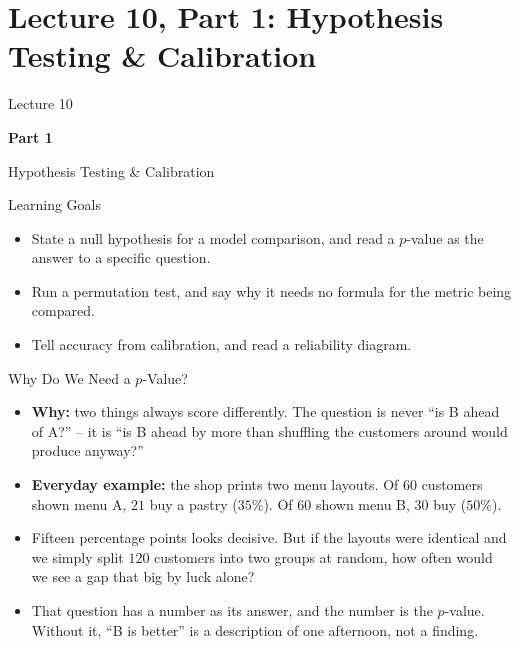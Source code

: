 \section{Lecture 10, Part 1: Hypothesis Testing \& Calibration}

\begin{frame}
\vfill
\centering
{\color{RLBlue}\large Lecture 10}

\vspace{0.3em}
{\color{RLBlue}\Large\bfseries Part 1}

\vspace{0.6em}
{\Large Hypothesis Testing \& Calibration}
\vfill
\end{frame}

\begin{frame}{Learning Goals}
\begin{itemize}
  \item State a null hypothesis for a model comparison, and read a $p$-value as the answer to a specific question.
  \pause
  \item Run a permutation test, and say why it needs no formula for the metric being compared.
  \pause
  \item Tell accuracy from calibration, and read a reliability diagram.
\end{itemize}
\end{frame}

\begin{frame}{Why Do We Need a $p$-Value?}
\begin{itemize}
  \item \textbf{Why:} two things always score differently. The question is never ``is B ahead of A?'' -- it is ``is B ahead by more than shuffling the customers around would produce anyway?''
  \pause
  \item \textbf{Everyday example:} the shop prints two menu layouts. Of $60$ customers shown menu A, $21$ buy a pastry ($35\%$). Of $60$ shown menu B, $30$ buy ($50\%$).
  \pause
  \item Fifteen percentage points looks decisive. But if the layouts were identical and we simply split $120$ customers into two groups at random, how often would we see a gap that big by luck alone?
  \pause
  \item That question has a number as its answer, and the number is the $p$-value. Without it, ``B is better'' is a description of one afternoon, not a finding.
\end{itemize}
\end{frame}

